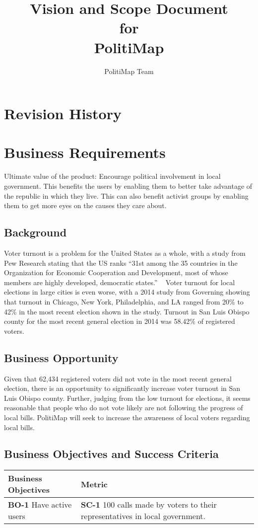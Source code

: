 \documentclass{article}
\title{Vision and Scope Document\\\large for\\\Large PolitiMap}
\author{PolitiMap Team}
\begin{document}
\maketitle
\tableofcontents
\section{Revision History}
\section{Business Requirements}
Ultimate value of the product: Encourage political involvement in
local government. This benefits the users by enabling them to better
take advantage of the republic in which they live. This can also
benefit activist groups by enabling them to get more eyes on the
causes they care about.

\subsection{Background}
Voter turnout is a problem for the United States as a whole, with a
study from Pew Research stating that the US ranks “31st among the 35
countries in the Organization for Economic Cooperation and
Development, most of whose members are highly developed, democratic
states.”  \cite{pew} Voter turnout for local elections in large cities
is even worse, with a 2014 study from Governing showing that turnout
in Chicago, New York, Philadelphia, and LA ranged from 20\% to 42\% in
the most recent election shown in the study. \cite{governing} Turnout
in San Luis Obispo county for the most recent general election in 2014
was 58.42\% of registered voters. \cite{slocounty}

\subsection{Business Opportunity}
Given that 62,434 registered voters did not vote in the most recent
general election, there is an opportunity to significantly increase
voter turnout in San Luis Obispo county. Further, judging from the low
turnout for elections, it seems reasonable that people who do not vote
likely are not following the progress of local bills. PolitiMap will
seek to increase the awareness of local voters regarding local bills.

\subsection{Business Objectives and Success Criteria}
\begin{tabu}{lX}
  \toprule
  Business Objectives & Metric\\
  \midrule
  \textbf{BO-1} Have active users & \textbf{SC-1} 100 calls made by
  voters to their representatives in local government.\\
  \bottomrule
\end{tabu}
\end{document}
